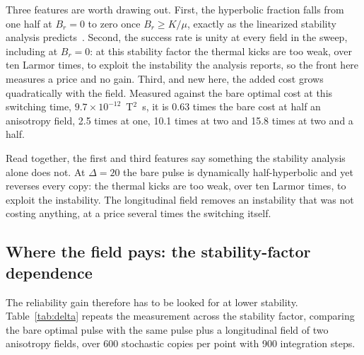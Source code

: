 \documentclass[11pt]{article}
\begin{document}
Three features are worth drawing out. First, the hyperbolic fraction falls from one half at $B_r = 0$
to zero once $B_r \ge K/\mu$, exactly as the linearized stability analysis
predicts~\citep{badarneh2023stability}. Second, the success rate is unity at every field in the sweep,
including at $B_r = 0$: at this stability factor the thermal kicks are too weak, over ten Larmor times,
to exploit the instability the analysis reports, so the front here measures a price and no gain. Third,
and new here, the added cost grows quadratically with the field. Measured against
the bare optimal cost at this switching time, $9.7\times10^{-12}$~T$^2$~s, it is 0.63 times the bare cost
at half an anisotropy field, 2.5 times at one, 10.1 times at two and 15.8 times at two and a half.

Read together, the first and third features say something the stability analysis alone does not. At
$\Delta = 20$ the bare pulse is dynamically half-hyperbolic and yet reverses every copy: the thermal
kicks are too weak, over ten Larmor times, to exploit the instability. The longitudinal field removes an
instability that was not costing anything, at a price several times the switching itself.

\subsection*{Where the field pays: the stability-factor dependence}

The reliability gain therefore has to be looked for at lower stability. Table~\ref{tab:delta} repeats
the measurement across the stability factor, comparing the bare optimal pulse with the same pulse plus a
longitudinal field of two anisotropy fields, over 600 stochastic copies per point with 900 integration
steps.
\end{document}
